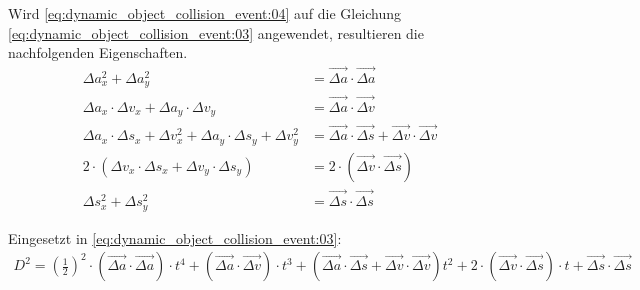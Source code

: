 Wird \ref{eq:dynamic_object_collision_event:04} auf die Gleichung \ref{eq:dynamic_object_collision_event:03} angewendet, resultieren die nachfolgenden
Eigenschaften.
\begin{align}
    \Delta a_x^2 + \Delta a_y^2 &= \vec{\Delta a} \cdot \vec{\Delta a} \\
    \Delta a_x \cdot \Delta v_x + \Delta a_y \cdot \Delta v_y &= \vec{\Delta a} \cdot \vec{\Delta v} \\
    \Delta a_x \cdot \Delta s_x + \Delta v_x^2 + \Delta a_y \cdot \Delta s_y + \Delta v_y^2 &= \vec{\Delta a} \cdot \vec{\Delta s} + \vec{\Delta v} \cdot \vec{\Delta v} \\
    2 \cdot (\Delta v_x \cdot \Delta s_x + \Delta v_y \cdot \Delta s_y) &= 2 \cdot (\vec{\Delta v} \cdot \vec{\Delta s}) \\
    \Delta s_x^2 + \Delta s_y^2 &= \vec{\Delta s} \cdot \vec{\Delta s}
\end{align}

Eingesetzt in \ref{eq:dynamic_object_collision_event:03}:
\begin{align}
    D^2 = (\frac{1}{2})^2 \cdot (\vec{\Delta a} \cdot \vec{\Delta a}) \cdot t^4 +
        (\vec{\Delta a} \cdot \vec{\Delta v}) \cdot t^3 +
        (\vec{\Delta a} \cdot \vec{\Delta s} + \vec{\Delta v} \cdot \vec{\Delta v}) t^2 +
        2 \cdot (\vec{\Delta v} \cdot \vec{\Delta s}) \cdot t +
        \vec{\Delta s} \cdot \vec{\Delta s}
\end{align}